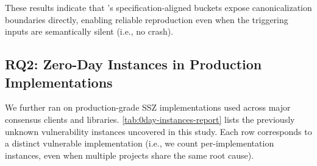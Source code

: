 \begin{table}[t]
\centering
\caption{Bug reproduction effectiveness on historical SSZ vulnerabilities. We report median TTE over 30 cold-start runs. ``--'' indicates the bug was not found within the 30-minute timeout.}
\label{tab:repro-report}
\small
{}
\end{table}


These results indicate that \tool{}'s specification-aligned buckets expose canonicalization boundaries directly, enabling reliable reproduction even when the triggering inputs are semantically silent (i.e., no crash).

\subsection{RQ2: Zero-Day Instances in Production Implementations}

We further ran \tool on production-grade SSZ implementations used across major consensus clients and libraries.
\autoref{tab:0day-instances-report} lists the previously unknown vulnerability instances uncovered in this study.
Each row corresponds to a distinct vulnerable implementation (i.e., we count per-implementation instances, even when multiple projects share the same root cause).

